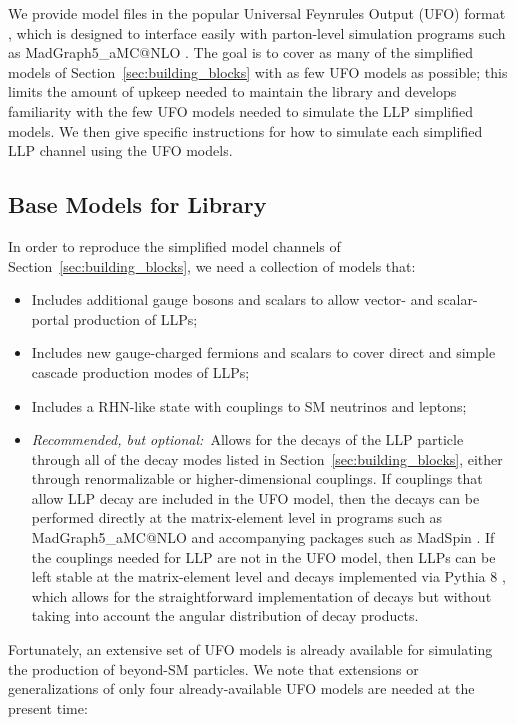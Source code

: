 We provide model files in the popular Universal Feynrules Output (UFO) format \cite{Degrande:2011ua}, which is designed to interface easily with parton-level simulation programs such as MadGraph5\_aMC@NLO \cite{Alwall:2014hca}. The goal is to cover as many of the simplified models of Section~\ref{sec:building_blocks} with as few UFO models as possible; this limits the amount of upkeep needed to maintain the library and develops familiarity with the few UFO models needed to simulate the LLP simplified models. We then give specific instructions for how to simulate each simplified LLP channel using the UFO models. 



\subsection{Base Models for Library}\label{sec:base}

In order to reproduce the simplified model channels of Section~\ref{sec:building_blocks}, we need a collection of models that:
%
\begin{itemize}
\item Includes additional gauge bosons and scalars to allow vector- and scalar-portal production of LLPs;
\item Includes new gauge-charged fermions and scalars to cover direct and simple cascade production modes of LLPs;
\item Includes a RHN-like state with couplings to SM neutrinos and leptons;
\item \emph{Recommended, but optional:}~Allows for the decays of the LLP particle through all of the decay modes listed in Section~\ref{sec:building_blocks}, either through renormalizable or higher-dimensional couplings. If couplings that allow LLP decay are included in the UFO model, then the decays can be performed directly at the matrix-element level in programs such as MadGraph5\_aMC@NLO \cite{Alwall:2014hca} and accompanying packages such as MadSpin \cite{Artoisenet:2012st}. If the couplings needed for LLP are not in the UFO model, then LLPs can be left stable at the matrix-element level and decays implemented via Pythia 8 \cite{Sjostrand:2007gs,Sjostrand:2014zea}, which allows for the straightforward implementation of decays but without taking into account the angular distribution of decay products.
\end{itemize}

Fortunately, an extensive set of UFO models is already available for simulating the production of beyond-SM particles. We note that extensions or generalizations of only four already-available UFO models are needed at the present time:

